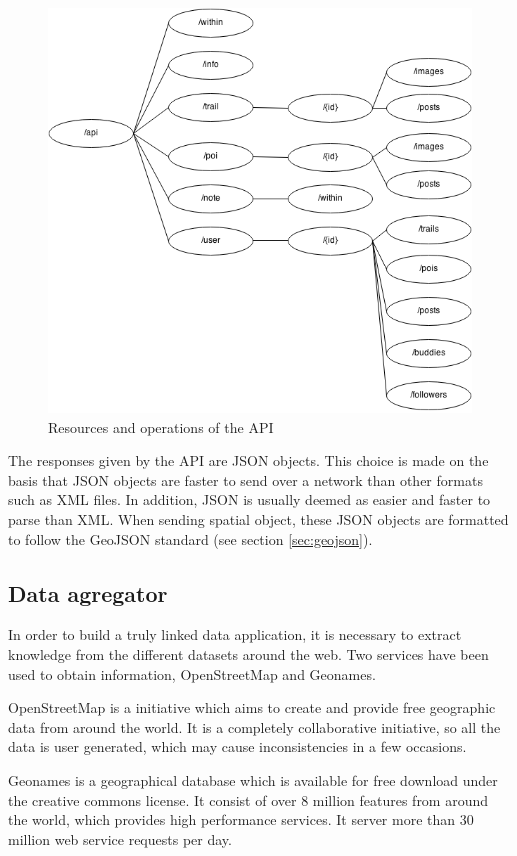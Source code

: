 \begin{figure}[ht]
  \centering
  \includegraphics[width=.8\textwidth]{fig/api-diagram}
  \caption{Resources and operations of the API}
  \label{fig:api-diagram}
\end{figure}

The responses given by the API are JSON objects. This choice is made on the basis that JSON objects are faster to send over a network than other formats such as XML files. In addition, JSON is usually deemed as easier and faster to parse than XML. When sending spatial object, these JSON objects are formatted to follow the GeoJSON standard (see section \ref{sec:geojson}).

\subsection{Data agregator}

In order to build a truly linked data application, it is necessary to extract knowledge from the different datasets around the web. Two services have been used to obtain information, OpenStreetMap and Geonames.

OpenStreetMap is a initiative which aims to create and provide free geographic data from around the world. It is a completely collaborative initiative, so all the data is user generated, which may cause inconsistencies in a few occasions.

Geonames is a geographical database which is available for free download under the creative commons license. It consist of over 8 million features from around the world, which provides high performance services. It server more than 30 million web service requests per day.

